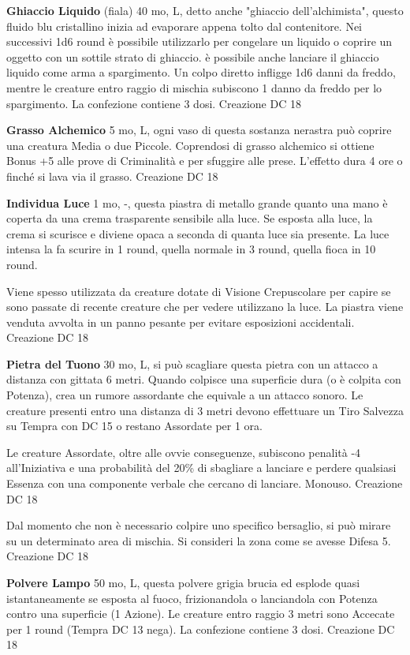 \documentclass[a4paper,11pt,twoside,openany]{book}
\begin{document}
{\textbf{Ghiaccio Liquido} (fiala) 40 mo, L, detto anche "ghiaccio dell'alchimista", questo fluido blu cristallino inizia ad evaporare appena tolto dal contenitore. Nei successivi 1d6 round è possibile utilizzarlo per congelare un liquido o coprire un oggetto con un sottile strato di ghiaccio. è possibile anche lanciare il ghiaccio liquido come arma a spargimento. Un colpo diretto infligge 1d6 danni da freddo, mentre le creature entro raggio di mischia subiscono 1 danno da freddo per lo spargimento. La confezione contiene 3 dosi. Creazione DC 18

\textbf{Grasso Alchemico} 5 mo, L, ogni vaso di questa sostanza nerastra può coprire una creatura Media o due Piccole. Coprendosi di grasso alchemico si ottiene Bonus +5 alle prove di Criminalità e per sfuggire alle prese. L'effetto dura 4 ore o finché si lava via il grasso. Creazione DC 18

\textbf{Individua Luce} 1 mo, -, questa piastra di metallo grande quanto una mano è coperta da una crema trasparente sensibile alla luce. Se esposta alla luce, la crema si scurisce e diviene opaca a seconda di quanta luce sia presente. La luce intensa la fa scurire in 1 round, quella normale in 3 round, quella fioca in 10 round. 

Viene spesso utilizzata da creature dotate di Visione Crepuscolare per capire se sono passate di recente creature che per vedere utilizzano la luce. La piastra viene venduta avvolta in un panno pesante per evitare esposizioni accidentali. Creazione DC 18

\textbf{Pietra del Tuono} 30 mo, L, si può scagliare questa pietra con un attacco a distanza con gittata 6 metri. Quando colpisce una superficie dura (o è colpita con Potenza), crea un rumore assordante che equivale a un attacco sonoro. Le creature presenti entro una distanza di 3 metri devono effettuare un Tiro Salvezza su Tempra con DC 15 o restano Assordate per 1 ora. 

Le creature Assordate, oltre alle ovvie conseguenze, subiscono penalità -4 all'Iniziativa e una probabilità del 20\% di sbagliare a lanciare e perdere qualsiasi Essenza con una componente verbale che cercano di lanciare. Monouso. Creazione DC 18

Dal momento che non è necessario colpire uno specifico bersaglio, si può mirare su un determinato area di mischia. Si consideri la zona come se avesse Difesa 5. Creazione DC 18

\textbf{Polvere Lampo} 50 mo, L, questa polvere grigia brucia ed esplode quasi istantaneamente se esposta al fuoco, frizionandola o lanciandola con Potenza contro una superficie (1 Azione). Le creature entro raggio 3 metri sono Accecate per 1 round (Tempra DC 13 nega). La confezione contiene 3 dosi. Creazione DC 18

}
\end{document}
